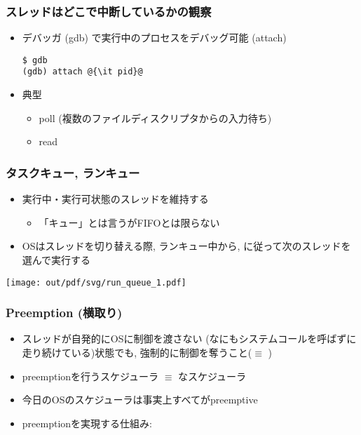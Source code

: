 \documentclass[12pt,dvipdfmx]{beamer}
\begin{document}
\begin{frame}[fragile]
  \frametitle{スレッドはどこで中断しているかの観察}
  \begin{itemize}
  \item デバッガ (gdb) で実行中のプロセスをデバッグ可能 (attach)
\begin{lstlisting}
$ gdb
(gdb) attach @{\it pid}@
\end{lstlisting} %
\item 典型
  \begin{itemize}
  \item poll (複数のファイルディスクリプタからの入力待ち)
  \item read
  \end{itemize}
\end{itemize}
\end{frame}

\begin{frame}
  \frametitle{タスクキュー, ランキュー}
  \begin{itemize}
  \item 実行中・実行可状態のスレッドを維持する
    \begin{itemize}
    \item 「キュー」とは言うがFIFOとは限らない
    \end{itemize}
  \item OSはスレッドを切り替える際,
    ランキュー中から, に従って次のスレッドを選んで実行する
  \end{itemize}

  \begin{center}
    \texttt{[image: out/pdf/svg/run\_queue\_1.pdf]}
  \end{center}
  
\end{frame}

\begin{frame}
  \frametitle{Preemption (横取り)}
  \begin{itemize}
  \item スレッドが自発的にOSに制御を渡さない
    (なにもシステムコールを呼ばずに走り続けている)状態でも,
    強制的に制御を奪うこと($\equiv$ )
  \item preemptionを行うスケジューラ $\equiv$ なスケジューラ
  \item 今日のOSのスケジューラは事実上すべてがpreemptive
  \item preemptionを実現する仕組み: 
  \end{itemize}
\end{frame}
\end{document}
